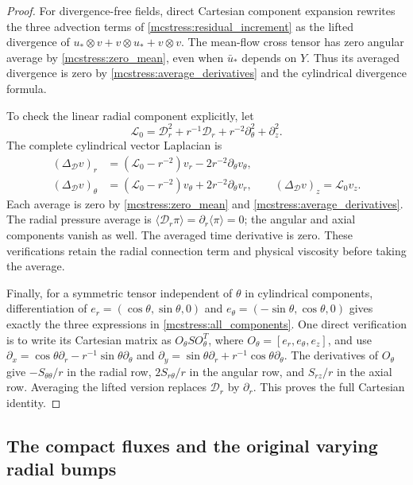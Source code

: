 \begin{proof}
For divergence-free fields, direct Cartesian component expansion
rewrites the three advection terms of \eqref{mcstress:residual_increment}
as the lifted divergence of
$u_*\otimes v+v\otimes u_*+v\otimes v$.
The mean-flow cross tensor has zero angular average by
\eqref{mcstress:zero_mean}, even when $\bar u_*$ depends on $Y$.
Thus its averaged divergence is zero by
\eqref{mcstress:average_derivatives} and the cylindrical divergence
formula.

To check the linear radial component explicitly, let
\[
 \mathscr L_0=\mathscr D_r^2+r^{-1}\mathscr D_r
             +r^{-2}\partial_\theta^2+\partial_z^2.
\]
The complete cylindrical vector Laplacian is
\[
 \begin{aligned}
 (\Delta_{\mathscr D}v)_r&=(\mathscr L_0-r^{-2})v_r
                       -2r^{-2}\partial_\theta v_\theta,\\
 (\Delta_{\mathscr D}v)_\theta&=(\mathscr L_0-r^{-2})v_\theta
                       +2r^{-2}\partial_\theta v_r,\qquad
 (\Delta_{\mathscr D}v)_z=\mathscr L_0v_z.
 \end{aligned}
\]
Each average is zero by \eqref{mcstress:zero_mean} and
\eqref{mcstress:average_derivatives}. The radial pressure average is
$\langle\mathscr D_r\pi\rangle=\partial_r\langle\pi\rangle=0$;
the angular and axial components vanish as well. The averaged time
derivative is zero. These verifications retain the radial connection
term and physical viscosity before taking the average.

Finally, for a symmetric tensor independent of $\theta$ in cylindrical
components, differentiation of
$e_r=(\cos\theta,\sin\theta,0)$ and
$e_\theta=(-\sin\theta,\cos\theta,0)$ gives exactly the three
expressions in \eqref{mcstress:all_components}. One direct verification
is to write its Cartesian matrix as $O_\theta S O_\theta^T$, where
$O_\theta=[e_r,e_\theta,e_z]$, and use
$\partial_x=\cos\theta\partial_r-r^{-1}\sin\theta\partial_\theta$
and $\partial_y=\sin\theta\partial_r+r^{-1}\cos\theta\partial_\theta$.
The derivatives of $O_\theta$ give $-S_{\theta\theta}/r$ in the radial
row, $2S_{r\theta}/r$ in the angular row, and $S_{rz}/r$ in the axial
row. Averaging the lifted version replaces $\mathscr D_r$ by
$\partial_r$. This proves the full Cartesian identity.
\end{proof}

\subsection{The compact fluxes and the original varying radial bumps}

